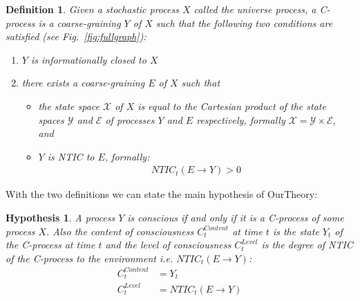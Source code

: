 \documentclass[utf8]{article}
\newtheorem{definition}{Definition}
\newtheorem*{hypothesis}{Hypothesis}
\begin{document}
         \begin{definition}
        Given a stochastic process $X$ called the universe process, a \emph{C-process} is a coarse-graining $Y$ of $X$ such that the following two conditions are satisfied (see Fig.~\ref{fig:fullgraph}):
        \begin{enumerate}
        \item $Y$ is informationally closed to $X$
        \item there exists a coarse-graining $E$ of $X$ such that
        \begin{itemize}
            \item the state space $\mathcal{X}$ of $X$ is equal to the Cartesian product of the state spaces $\mathcal{Y}$ and $\mathcal{E}$ of processes $Y$ and $E$ respectively, formally $\mathcal{X}=\mathcal{Y}\times\mathcal{E}$, and 
            \item $Y$ is NTIC to $E$, formally:
        \begin{align}
            NTIC_t(E\rightarrow Y) >0
        \end{align}
        \end{itemize} 
        \end{enumerate}
       \end{definition}
      
        
        
        With the two definitions we can state the main hypothesis of \ac{OurTheory}:
        
        \begin{hypothesis}
        A process $Y$ is conscious if and only if it is a C-process of some process $X$. Also the content of consciousness $C_t^{Content}$ at time $t$ is the state $Y_t$ of the C-process at time $t$ and the level of consciousness $C_t^{Level}$ is the degree of NTIC of the C-process to the environment i.e. $NTIC_t(E\rightarrow Y)$:
        \begin{align}
            C_t^{Content} &= Y_t \label{eq:cContent}\\
            C_t^{Level} &= NTIC_t(E\rightarrow Y) \label{eq:cLevel}
        \end{align}
        \end{hypothesis}
        
        
        
\end{document}
